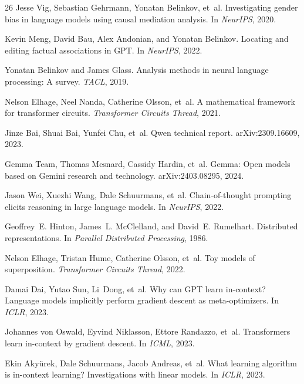 \documentclass[sigconf,anonymous]{acmart}
\begin{document}
\begin{thebibliography}{26}
Jesse Vig, Sebastian Gehrmann, Yonatan Belinkov, et~al.
\newblock Investigating gender bias in language models using causal mediation analysis.
\newblock In \emph{NeurIPS}, 2020.

Kevin Meng, David Bau, Alex Andonian, and Yonatan Belinkov.
\newblock Locating and editing factual associations in GPT.
\newblock In \emph{NeurIPS}, 2022.

Yonatan Belinkov and James Glass.
\newblock Analysis methods in neural language processing: A survey.
\newblock \emph{TACL}, 2019.

Nelson Elhage, Neel Nanda, Catherine Olsson, et~al.
\newblock A mathematical framework for transformer circuits.
\newblock \emph{Transformer Circuits Thread}, 2021.

Jinze Bai, Shuai Bai, Yunfei Chu, et~al.
\newblock Qwen technical report.
\newblock arXiv:2309.16609, 2023.

Gemma Team, Thomas Mesnard, Cassidy Hardin, et~al.
\newblock Gemma: Open models based on Gemini research and technology.
\newblock arXiv:2403.08295, 2024.

Jason Wei, Xuezhi Wang, Dale Schuurmans, et~al.
\newblock Chain-of-thought prompting elicits reasoning in large language models.
\newblock In \emph{NeurIPS}, 2022.

Geoffrey~E. Hinton, James~L. McClelland, and David~E. Rumelhart.
\newblock Distributed representations.
\newblock In \emph{Parallel Distributed Processing}, 1986.

Nelson Elhage, Tristan Hume, Catherine Olsson, et~al.
\newblock Toy models of superposition.
\newblock \emph{Transformer Circuits Thread}, 2022.

Damai Dai, Yutao Sun, Li~Dong, et~al.
\newblock Why can GPT learn in-context? Language models implicitly perform gradient descent as meta-optimizers.
\newblock In \emph{ICLR}, 2023.

Johannes von Oswald, Eyvind Niklasson, Ettore Randazzo, et~al.
\newblock Transformers learn in-context by gradient descent.
\newblock In \emph{ICML}, 2023.

Ekin Aky{\"u}rek, Dale Schuurmans, Jacob Andreas, et~al.
\newblock What learning algorithm is in-context learning? Investigations with linear models.
\newblock In \emph{ICLR}, 2023.


\end{thebibliography}
\end{document}

